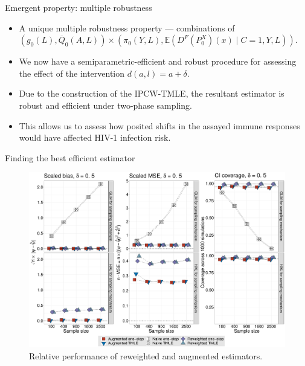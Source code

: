 \documentclass{beamer}
\newcommand{\E}{\mathbb{E}}
\begin{document}

\begin{frame}[c]{Emergent property: multiple robustness}

\begin{center}
\begin{itemize}
  \itemsep10pt
  \item A unique multiple robustness property --- combinations of
    $(g_0(L), \overline{Q}_0(A,L)) \times (\pi_0(Y, L), \E(D^F(P^X_0)(x) \mid
    C = 1, Y, L))$.
  \item We now have a semiparametric-efficient and robust procedure for
    assessing the effect of the intervention $d(a,l) = a + \delta$.
  \item Due to the construction of the IPCW-TMLE, the resultant estimator is
    robust and efficient under two-phase sampling.
  \item This allows us to assess how posited shifts in the assayed immune
    responses would have affected HIV-1 infection risk.
\end{itemize}
\end{center}

\note{
}

\end{frame}


\begin{frame}[c]{Finding the best efficient estimator}

\begin{figure}[H]
  \centering
  \includegraphics[scale=0.22]{simple_effect_panel_delta_upshift}
  \caption{
    Relative performance of reweighted and augmented estimators.
  }
\end{figure}

\note{
}

\end{frame}
\end{document}
